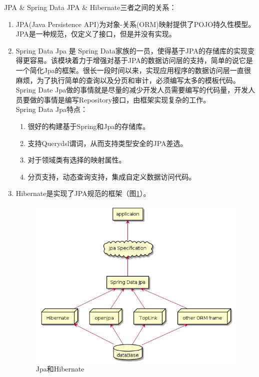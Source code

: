 JPA \& Spring Data JPA \& Hibernate三者之间的关系：
\begin{enumerate}
  \item JPA(Java Persistence API)为对象-关系(ORM)映射提供了POJO持久性模型。JPA是一种规范，仅定义了接口，但是并没有实现。
  \item Spring Data Jpa 是 Spring Data家族的一员，使得基于JPA的存储库的实现变得更容易。该模块着力于增强对基于JPA的数据访问层的支持，简单的说它是一个简化Jpa的框架。很长一段时间以来，实现应用程序的数据访问层一直很麻烦，为了执行简单的查询以及分页和审计，必须编写太多的模板代码。Spring Date Jpa做的事情就是尽量的减少开发人员需要编写的代码量，开发人员要做的事情是编写Repository接口，由框架实现复杂的工作。\\
        Spring Data Jpa特点：
        \begin{enumerate}
          \item 很好的构建基于Spring和Jpa的存储库。
          \item 支持Querydsl谓词，从而支持类型安全的JPA差选。
          \item 对于领域类有选择的映射属性。
          \item 分页支持，动态查询支持，集成自定义数据访问代码。
        \end{enumerate}
  \item Hibernate是实现了JPA规范的框架（图\ref{JpaAndHibernate}）。
        \begin{figure}[H]
          \centering
          \includegraphics[scale = 0.6]{out/uml/部署图/Jpa和Hibernate/Jpa和Hibernate.png}
          \caption{\song\wuhao Jpa和Hibernate}
          \label{JpaAndHibernate}

\end{figure}
\end{enumerate}
